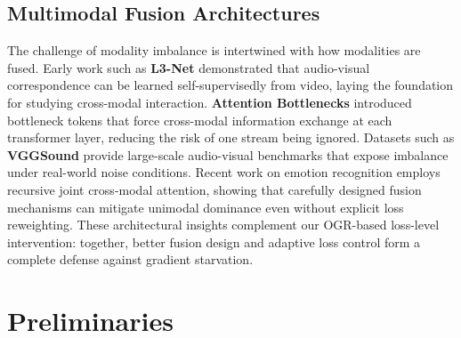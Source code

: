 \documentclass[10pt, twocolumn, letterpaper]{article}
\begin{document}
\begin{table}[h]
\centering
{}
\caption{\textbf{Comparison of Multimodal Imbalance Mitigation Strategies.} Our method combines the dynamic adaptability of OGM-GE with the low computational footprint required for modern large-scale pre-training.}
\label{tab:relwork}
\end{table}

\subsection{Multimodal Fusion Architectures}
The challenge of modality imbalance is intertwined with how modalities are fused. Early work such as \textbf{L3-Net} \cite{arandjelovic2017look} demonstrated that audio-visual correspondence can be learned self-supervisedly from video, laying the foundation for studying cross-modal interaction. \textbf{Attention Bottlenecks} \cite{nagrani2021attention} introduced bottleneck tokens that force cross-modal information exchange at each transformer layer, reducing the risk of one stream being ignored. Datasets such as \textbf{VGGSound} \cite{chen2020vggsound} provide large-scale audio-visual benchmarks that expose imbalance under real-world noise conditions. Recent work on emotion recognition \cite{praveen2024recursive} employs recursive joint cross-modal attention, showing that carefully designed fusion mechanisms can mitigate unimodal dominance even without explicit loss reweighting. These architectural insights complement our OGR-based loss-level intervention: together, better fusion design and adaptive loss control form a complete defense against gradient starvation.

\section{Preliminaries}
\end{document}
